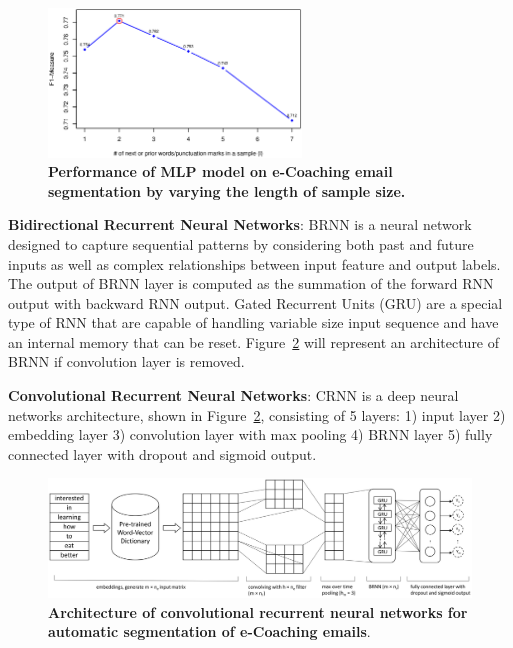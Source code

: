 \documentclass{amia}
\begin{document}
\begin{figure}[!htb]
    \centering
    \includegraphics[width=0.60\textwidth]{figures/length-mlp.eps}
    \caption{\textbf{Performance of MLP model on e-Coaching email segmentation by varying the length of sample size.}}
    \label{fig:length-mlp}
\end{figure}

\textbf{Bidirectional Recurrent Neural Networks}: BRNN is a neural network designed to capture sequential patterns by considering both past and future inputs as well as complex relationships between input feature and output labels. The output of BRNN layer is computed as the summation of the forward RNN output with backward RNN output. Gated Recurrent Units (GRU) \cite{chung2014empirical} are a special type of RNN that are capable of handling variable size input sequence and have an internal memory that can be reset. Figure~\ref{fig:crnn} will represent an architecture of BRNN if convolution layer is removed.  

\textbf{Convolutional Recurrent Neural Networks}: CRNN is a deep neural networks architecture, shown in Figure~\ref{fig:crnn}, consisting of 5 layers: 1) input layer 2) embedding layer 3) convolution layer with max pooling 4) BRNN layer 5) fully connected layer with dropout and sigmoid output. 

\begin{figure}[!htb]
    \centering
    \includegraphics[width=1.0\textwidth]{figures/CRNN.eps}
    \caption{\textbf{Architecture of convolutional recurrent neural networks for automatic segmentation of e-Coaching emails}.}
    \label{fig:crnn}
\end{figure}
\end{document}
